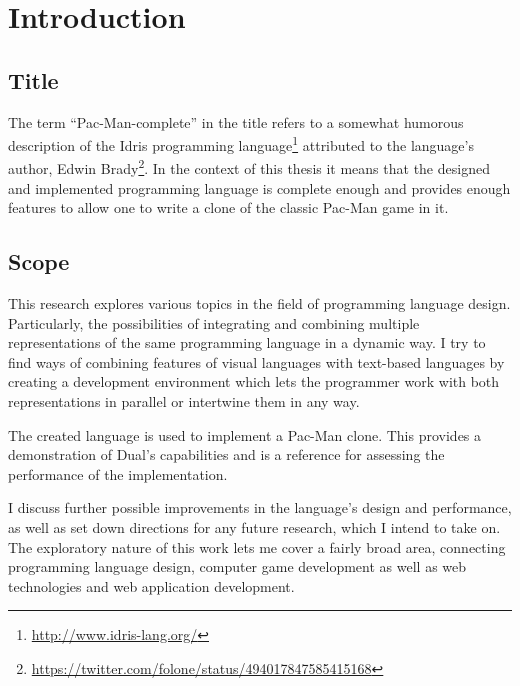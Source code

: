 \chapter{Introduction}\label{chap:intro}

\section{Title}
The term ``Pac-Man-complete'' in the title refers to a somewhat humorous description of the Idris programming language\footnote{\url{http://www.idris-lang.org/}} attributed to the language's author, Edwin Brady\footnote{\url{https://twitter.com/folone/status/494017847585415168}}. In the context of this thesis it means that the designed and implemented programming language is complete enough and provides enough features to allow one to write a clone of the classic Pac-Man game in it.

\section{Scope}
This research explores various topics in the field of programming language design. Particularly, the possibilities of integrating and combining multiple representations of the same programming language in a dynamic way. I try to find ways of combining features of visual languages with text-based languages by creating a development environment which lets the programmer work with both representations in parallel or intertwine them in any way.

The created language is used to implement a Pac-Man clone. This provides a demonstration of Dual's capabilities and is a reference for assessing the performance of the implementation.

I discuss further possible improvements in the language's design and performance, as well as set down directions for any future research, which I intend to take on. The exploratory nature of this work lets me cover a fairly broad area, connecting programming language design, computer game development as well as web technologies and web application development.


